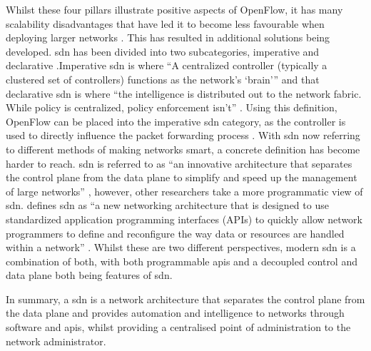 Whilst these four pillars illustrate positive aspects of OpenFlow, it has many scalability disadvantages that have led it to become less favourable when deploying larger networks \citep{8784036}. This has resulted in additional
solutions being developed. \gls{sdn} has been divided into two subcategories, imperative and declarative \citep{10}.Imperative \gls{sdn} is where ``A centralized controller (typically a clustered set of controllers) functions as
the network’s ‘brain’'' \citep{10} and that declarative \gls{sdn} is where ``the intelligence is distributed out to the network fabric. While policy is centralized, policy enforcement isn’t'' \citep{10}. Using this definition,
OpenFlow can be placed into the imperative \gls{sdn} category, as the controller is used to directly influence the packet forwarding process \citep{11}. With \gls{sdn} now referring to different methods of making networks smart, a concrete definition has become harder to reach. \gls{sdn} is referred to as ``an innovative architecture that separates the control plane from the data plane to simplify and speed up the management of large networks'' \citep{app11156999}, however, other researchers take a more programmatic view of \gls{sdn}. \citeauthor{9} defines \gls{sdn} as  ``a new networking architecture that is designed to use standardized application programming interfaces (APIs) to quickly allow network programmers to define and reconfigure the way data or resources are handled within a network'' \citep{9}. Whilst these are two different perspectives, modern \gls{sdn} is a combination of both, with both programmable \gls{api}s and a decoupled control and data plane both being features of \gls{sdn}.

In summary, a \gls{sdn} is a network architecture that separates the control plane from the data plane and provides automation and intelligence to networks through software and \gls{api}s, whilst providing a centralised point of administration to the network administrator.

